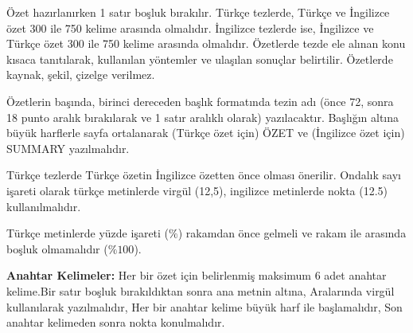 \documentclass[a4paper,oneside,12pt]{report}
\begin{document}
\listoftables
\listoffigures

\begin{ozet}
Özet hazırlanırken 1 satır boşluk bırakılır.
Türkçe tezlerde, Türkçe ve İngilizce özet 300 ile 750 kelime arasında olmalıdır.
İngilizce tezlerde ise, İngilizce ve Türkçe özet 300 ile 750 kelime arasında olmalıdır.
Özetlerde tezde ele alınan konu kısaca tanıtılarak, kullanılan yöntemler ve ulaşılan
sonuçlar belirtilir. Özetlerde kaynak, şekil, çizelge verilmez. 

Özetlerin başında, birinci dereceden başlık formatında tezin adı (önce 72, sonra 18
punto aralık bırakılarak ve 1 satır aralıklı olarak) yazılacaktır. Başlığın altına büyük harflerle sayfa ortalanarak (Türkçe özet için) ÖZET ve (İngilizce özet için)
SUMMARY yazılmalıdır.

Türkçe tezlerde Türkçe özetin İngilizce özetten önce olması önerilir.
Ondalık sayı işareti olarak türkçe metinlerde virgül (12,5), ingilizce metinlerde nokta (12.5) kullanılmalıdır.

Türkçe metinlerde yüzde işareti ($\%$) rakamdan önce gelmeli ve rakam ile arasında boşluk olmamalıdır ($\%100$).

\lipsum[1 -1]

\vspace{\baselineskip}
\textbf{Anahtar Kelimeler:} Her bir özet için belirlenmiş maksimum 6 adet anahtar kelime.Bir satır boşluk bırakıldıktan sonra ana metnin altına, Aralarında virgül kullanılarak yazılmalıdır, Her bir anahtar kelime büyük harf ile başlamalıdır, Son anahtar kelimeden sonra nokta konulmalıdır.
\end{ozet}
\begin{abstract}
1 line spacing must be set for summaries. For theses in Turkish, the summary in
Turkish must have 300 words minimum and 750 words maximum.

For theses in English, the summary in English must have 300 words minimum and 750
words maximum. A summary must briefly mention the subject of the thesis, the
method(s) used and the conclusions derived.

References, figures and tables must not be given in Summary.

Above the Summary, the thesis title in first level title format (i.e., 72 pt before and 18 pt after paragraph spacing, and 1 line spacing) must be placed. Below the title, the expression ÖZET (for summary in Turkish) and SUMMARY (for summary in English) must be written horizontally centered.

It is recommended that the summary in English is placed before the summary in
Turkish.

In English texts, the percent sign ($\%$) should come after the number and there should
be no space between the number and the percent sign ($100\%$).

\lipsum[1 -1]
\vspace{\baselineskip}

\textbf{Keywords:}
\end{abstract}
\end{document}
